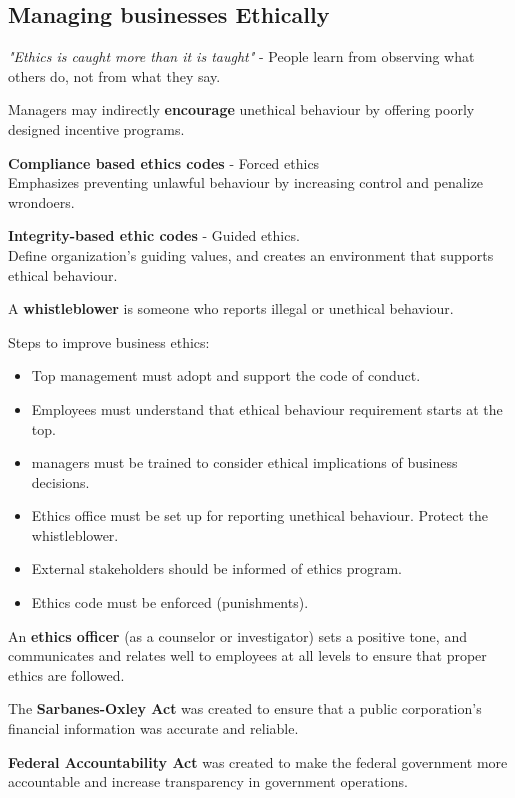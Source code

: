 \documentclass[english, 12pt]{article}
\begin{document}
\subsection{Managing businesses Ethically}
\begin{defn}
\textit{"Ethics is caught more than it is taught"} - People learn from observing what others do, not from what they say.
\end{defn}
\begin{exmp}
Managers may indirectly \textbf{encourage} unethical behaviour by offering poorly designed incentive programs.
\end{exmp}
\begin{defn}
\textbf{Compliance based ethics codes} - Forced ethics\\
Emphasizes preventing unlawful behaviour by increasing control and penalize wrondoers.
\end{defn}
\begin{defn}
\textbf{Integrity-based ethic codes} - Guided ethics.\\
Define organization's guiding values, and creates an environment that supports ethical behaviour.
\end{defn}
\begin{defn}
A \textbf{whistleblower} is someone who reports illegal or unethical behaviour.
\end{defn}
Steps to improve business ethics:
\begin{itemize}
\item Top management must adopt and support the code of conduct.
\item Employees must understand that ethical behaviour requirement starts at the top.
\item managers must be trained to consider ethical implications of business decisions.
\item Ethics office must be set up for reporting unethical behaviour. Protect the whistleblower.
\item External stakeholders should be informed of ethics program.
\item Ethics code must be enforced (punishments).
\end{itemize}
\begin{defn}
An \textbf{ethics officer} (as a counselor or investigator) sets a positive tone, and communicates and relates well to employees at all levels to ensure that proper ethics are followed.
\end{defn}
\begin{defn}[SOX]
The \textbf{Sarbanes-Oxley Act} was created to ensure that a public corporation's financial information was accurate and reliable.
\end{defn}
\begin{defn}[FAA]
\textbf{Federal Accountability Act} was created to make the federal government more accountable and increase transparency in government operations.
\end{defn}
\end{document}

